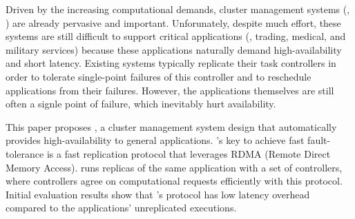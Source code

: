 
Driven by the increasing computational demands, cluster management systems 
(\eg, \mesos) are already pervasive and important. Unforunately, despite much 
effort, these systems are still difficult to support critical applications 
(\eg, trading, medical, and military services) because these applications 
naturally demand high-availability and short latency. Existing systems 
typically replicate their task controllers in order to tolerate single-point 
failures of this controller and to reschedule applications from their failures. 
However, the applications themselves are still often a signle point of failure, 
which inevitably hurt availability.


This paper proposes \xxx, a cluster management system design that automatically 
provides high-availability to general applications. \xxx's key to achieve fast 
fault-tolerance is a fast \paxos replication protocol that leverages RDMA 
(Remote Direct Memory Access). \xxx runs replicas of the same application with 
a set of controllers, where controllers agree on computational requests 
efficiently with this protocol. Initial evaluation results show that \xxx's 
protocol has low latency overhead compared to the applications' unreplicated 
executions.


